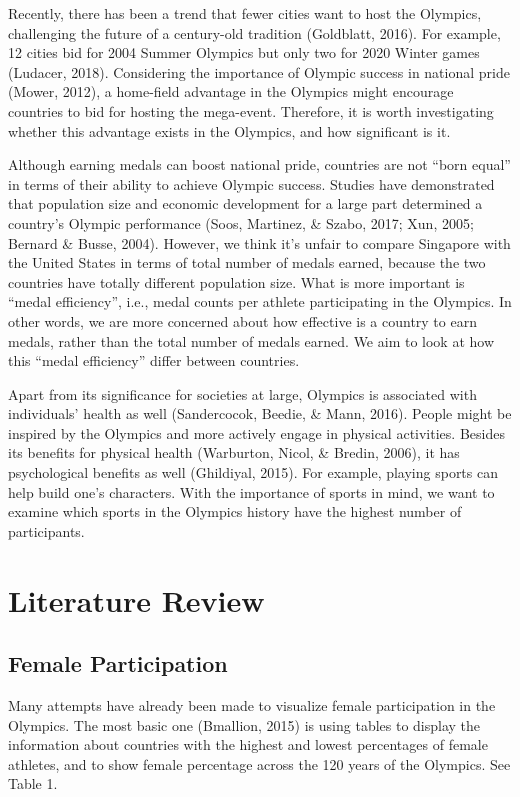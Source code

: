 \documentclass[12pt]{article}
\begin{document}
Recently, there has been a trend that fewer cities want to host the Olympics, challenging the future of a century-old tradition (Goldblatt, 2016). For example, 12 cities bid for 2004 Summer Olympics but only two for 2020 Winter games (Ludacer, 2018). Considering the importance of Olympic success in national pride (Mower, 2012), a home-field advantage in the Olympics might encourage countries to bid for hosting the mega-event. Therefore, it is worth investigating whether this advantage exists in the Olympics, and how significant is it. 

Although earning medals can boost national pride, countries are not “born equal” in terms of their ability to achieve Olympic success. Studies have demonstrated that population size and economic development for a large part determined a country’s Olympic performance (Soos, Martinez, \& Szabo, 2017; Xun, 2005; Bernard \& Busse, 2004). However, we think it’s unfair to compare Singapore with the United States in terms of total number of medals earned, because the two countries have totally different population size. What is more important is “medal efficiency”, i.e., medal counts per athlete participating in the Olympics. In other words, we are more concerned about how effective is a country to earn medals, rather than the total number of medals earned. We aim to look at how this “medal efficiency” differ between countries. 

Apart from its significance for societies at large, Olympics is associated with individuals’ health as well (Sandercocok, Beedie, \&  Mann, 2016). People might be inspired by the Olympics and more actively engage in physical activities. Besides its benefits for physical health (Warburton, Nicol, \& Bredin, 2006), it has psychological benefits as well (Ghildiyal, 2015). For example, playing sports can help build one’s characters. With the importance of sports in mind, we want to examine which sports in the Olympics history have the highest number of participants. 


\section{Literature Review}

\subsection{Female Participation}

Many attempts have already been made to visualize female participation in the Olympics. The most basic one (Bmallion, 2015) is using tables to display the information about countries with the highest and lowest percentages of female athletes, and to show female percentage across the 120 years of the Olympics. See Table 1. 
\end{document}
